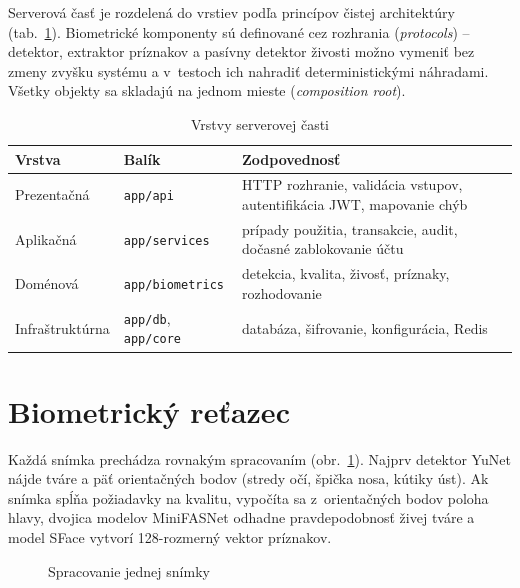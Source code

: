 Serverová časť je rozdelená do vrstiev podľa princípov čistej architektúry
(tab.~\ref{tab:vrstvy}). Biometrické komponenty sú definované cez rozhrania
(\emph{protocols}) – detektor, extraktor príznakov a pasívny detektor živosti možno
vymeniť bez zmeny zvyšku systému a v~testoch ich nahradiť deterministickými náhradami.
Všetky objekty sa skladajú na jednom mieste (\emph{composition root}).

\begin{table}[H]
  \centering
  \caption{Vrstvy serverovej časti}
  \label{tab:vrstvy}
  \begin{tabularx}{\textwidth}{@{}l l X@{}}
    \toprule
    Vrstva & Balík & Zodpovednosť \\
    \midrule
    Prezentačná & \texttt{app/api} & HTTP rozhranie, validácia vstupov, autentifikácia JWT, mapovanie chýb \\
    Aplikačná & \texttt{app/services} & prípady použitia, transakcie, audit, dočasné zablokovanie účtu \\
    Doménová & \texttt{app/biometrics} & detekcia, kvalita, živosť, príznaky, rozhodovanie \\
    Infraštruktúrna & \texttt{app/db}, \texttt{app/core} & databáza, šifrovanie, konfigurácia, Redis \\
    \bottomrule
  \end{tabularx}
\end{table}

\section{Biometrický reťazec}

Každá snímka prechádza rovnakým spracovaním (obr.~\ref{fig:retazec}). Najprv detektor
YuNet \cite{wu2023yunet} nájde tváre a päť orientačných bodov (stredy očí, špička nosa,
kútiky úst). Ak snímka spĺňa požiadavky na kvalitu, vypočíta sa z~orientačných bodov
poloha hlavy, dvojica modelov MiniFASNet odhadne pravdepodobnosť živej tváre a model
SFace \cite{zhong2021sface} vytvorí 128-rozmerný vektor príznakov.

\begin{figure}[H]
  \centering
  \caption{Spracovanie jednej snímky}
  \label{fig:retazec}
\end{figure}

